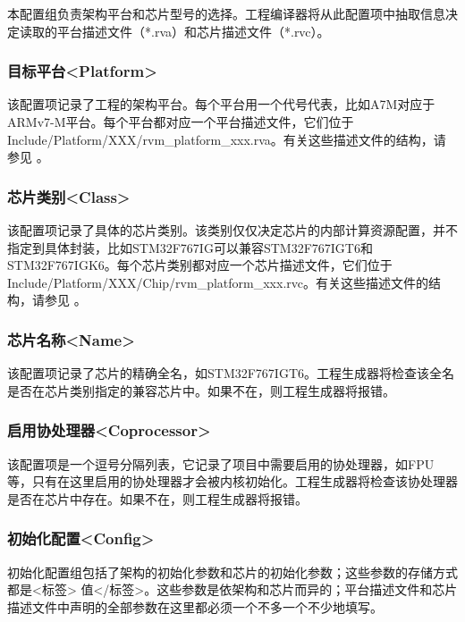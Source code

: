 本配置组负责架构平台和芯片型号的选择。工程编译器将从此配置项中抽取信息决定读取的平台描述文件（*.rva）和芯片描述文件（*.rvc）。

\subsubsection{目标平台<Platform>{}}\label{subsubsec:5-3-9-1}

该配置项记录了工程的架构平台。每个平台用一个代号代表，比如A7M对应于ARMv7-M平台。每个平台都对应一个平台描述文件，它们位于Include/Platform/XXX/rvm\_platform\_xxx.rva。有关这些描述文件的结构，请参见
。

\subsubsection{芯片类别<Class>{}}\label{subsubsec:5-3-9-2}

该配置项记录了具体的芯片类别。该类别仅仅决定芯片的内部计算资源配置，并不指定到具体封装，比如STM32F767IG可以兼容STM32F767IGT6和STM32F767IGK6。每个芯片类别都对应一个芯片描述文件，它们位于Include/Platform/XXX/Chip/rvm\_platform\_xxx.rvc。有关这些描述文件的结构，请参见
。

\subsubsection{芯片名称<Name>{}}\label{subsubsec:5-3-9-3}

该配置项记录了芯片的精确全名，如STM32F767IGT6。工程生成器将检查该全名是否在芯片类别指定的兼容芯片中。如果不在，则工程生成器将报错。

\subsubsection{启用协处理器<Coprocessor>{}}\label{subsubsec:5-3-9-4}

该配置项是一个逗号分隔列表，它记录了项目中需要启用的协处理器，如FPU等，只有在这里启用的协处理器才会被内核初始化。工程生成器将检查该协处理器是否在芯片中存在。如果不在，则工程生成器将报错。

\subsubsection{初始化配置<Config>{}}\label{subsubsec:5-3-9-5}

初始化配置组包括了架构的初始化参数和芯片的初始化参数；这些参数的存储方式都是<标签> 值</标签>。这些参数是依架构和芯片而异的；平台描述文件和芯片描述文件中声明的全部参数在这里都必须一个不多一个不少地填写。

